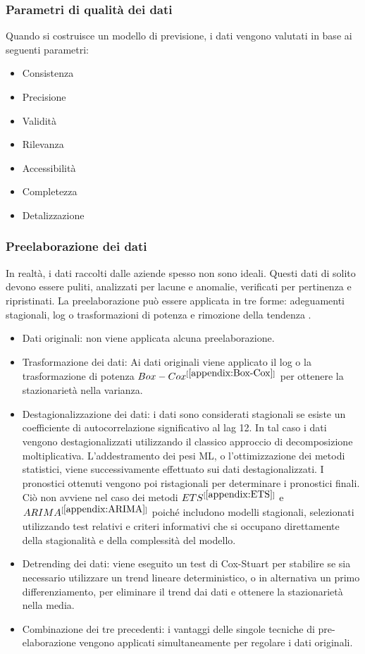 \documentclass[12pt,a4paper]{report}
\begin{document}
\subsubsection{Parametri di qualità dei dati}
Quando si costruisce un modello di previsione, i dati vengono valutati in base ai seguenti parametri:
\begin{itemize}
    \item Consistenza
    \item Precisione
    \item Validità
    \item Rilevanza
    \item Accessibilità
    \item Completezza
    \item Detalizzazione
\end{itemize}

\subsubsection{Preelaborazione dei dati}
In realtà, i dati raccolti dalle aziende spesso non sono ideali. Questi dati di solito devono essere puliti, analizzati per lacune e anomalie, verificati per pertinenza e ripristinati.
La preelaborazione può essere applicata in tre forme: adeguamenti stagionali, log o trasformazioni di potenza e rimozione della tendenza \cite{makridakis2018statistical}.
\begin{itemize}
    \item Dati originali: non viene applicata alcuna preelaborazione.
    \item Trasformazione dei dati: Ai dati originali viene applicato il log o la trasformazione di potenza $Box-Cox^{[\ref{appendix:Box-Cox}]}$ per ottenere la stazionarietà nella varianza.
    \item Destagionalizzazione dei dati: i dati sono considerati stagionali se esiste un coefficiente di autocorrelazione significativo al lag 12. In tal caso i dati vengono destagionalizzati utilizzando il classico approccio di decomposizione moltiplicativa. L'addestramento dei pesi ML, o l'ottimizzazione dei metodi statistici, viene successivamente effettuato sui dati destagionalizzati. I pronostici ottenuti vengono poi ristagionali per determinare i pronostici finali. Ciò non avviene nel caso dei metodi $ETS^{[\ref{appendix:ETS}]}$ e $ARIMA^{[\ref{appendix:ARIMA}]}$ poiché includono modelli stagionali, selezionati utilizzando test relativi e criteri informativi che si occupano direttamente della stagionalità e della complessità del modello.
    \item Detrending dei dati: viene eseguito un test di Cox-Stuart \cite{cox1955some} per stabilire se sia necessario utilizzare un trend lineare deterministico, o in alternativa un primo differenziamento, per eliminare il trend dai dati e ottenere la stazionarietà nella media.
    \item Combinazione dei tre precedenti: i vantaggi delle singole tecniche di pre-elaborazione vengono applicati simultaneamente per regolare i dati originali.
\end{itemize}
\end{document}
